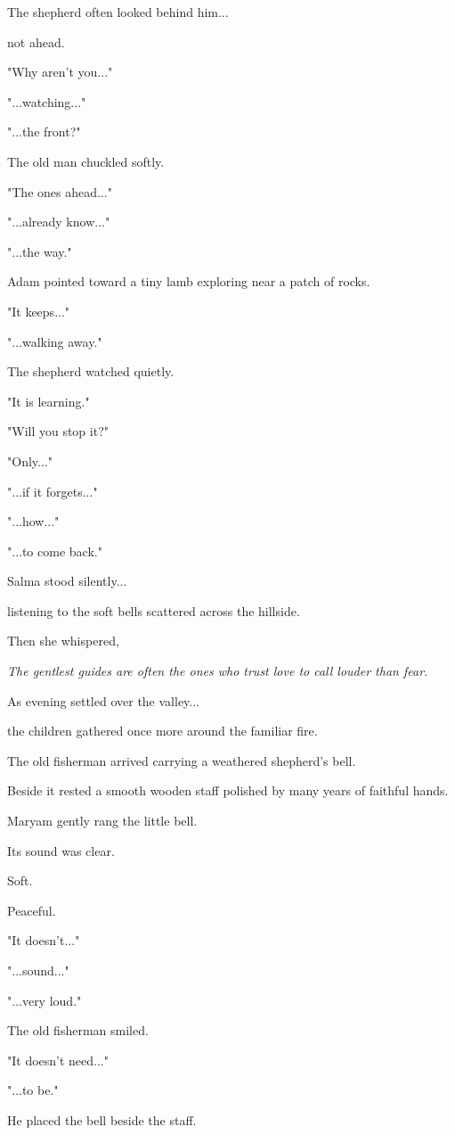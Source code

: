 \documentclass[12pt,openany]{book}
\begin{document}
The shepherd often looked behind him...

not ahead.

"Why aren't you..."

"...watching..."

"...the front?"

The old man chuckled softly.

"The ones ahead..."

"...already know..."

"...the way."

Adam pointed toward a tiny lamb exploring near a patch of rocks.

"It keeps..."

"...walking away."

The shepherd watched quietly.

"It is learning."

"Will you stop it?"

"Only..."

"...if it forgets..."

"...how..."

"...to come back."

Salma stood silently...

listening to the soft bells scattered across the hillside.

Then she whispered,

\emph{The gentlest guides are often the ones who trust love to call louder than fear.}

As evening settled over the valley...

the children gathered once more around the familiar fire.

The old fisherman arrived carrying a weathered shepherd's bell.

Beside it rested a smooth wooden staff polished by many years of faithful hands.

Maryam gently rang the little bell.

Its sound was clear.

Soft.

Peaceful.

"It doesn't..."

"...sound..."

"...very loud."

The old fisherman smiled.

"It doesn't need..."

"...to be."

He placed the bell beside the staff.
\end{document}
